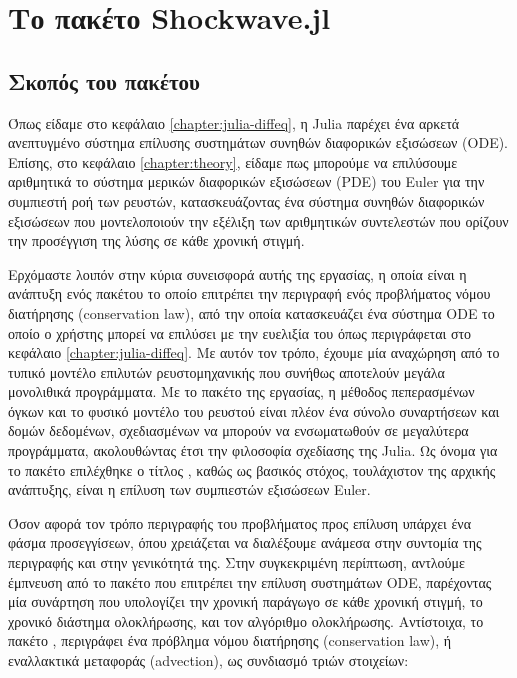 \chapter{Το πακέτο Shockwave.jl}

\section{Σκοπός του πακέτου}

Όπως είδαμε στο κεφάλαιο \ref{chapter:julia-diffeq}, η Julia παρέχει ένα αρκετά ανεπτυγμένο σύστημα επίλυσης συστημάτων συνηθών διαφορικών εξισώσεων (ODE).
Επίσης, στο κεφάλαιο \ref{chapter:theory}, είδαμε πως μπορούμε να επιλύσουμε αριθμητικά το σύστημα μερικών διαφορικών εξισώσεων (PDE) του Euler για την συμπιεστή ροή των ρευστών, κατασκευάζοντας ένα σύστημα συνηθών διαφορικών εξισώσεων που μοντελοποιούν την εξέλιξη των αριθμητικών συντελεστών που ορίζουν την προσέγγιση της λύσης σε κάθε χρονική στιγμή.

Ερχόμαστε λοιπόν στην κύρια συνεισφορά αυτής της εργασίας, η οποία είναι η ανάπτυξη ενός πακέτου το οποίο επιτρέπει την περιγραφή ενός προβλήματος νόμου διατήρησης (conservation law), από την οποία κατασκευάζει ένα σύστημα ODE το οποίο ο χρήστης μπορεί να επιλύσει με την ευελιξία του  όπως περιγράφεται στο κεφάλαιο \ref{chapter:julia-diffeq}.
Με αυτόν τον τρόπο, έχουμε μία αναχώρηση από το τυπικό μοντέλο επιλυτών ρευστομηχανικής που συνήθως αποτελούν μεγάλα μονολιθικά προγράμματα.
Με το πακέτο της εργασίας, η μέθοδος πεπερασμένων όγκων και το φυσικό μοντέλο του ρευστού είναι πλέον ένα σύνολο συναρτήσεων και δομών δεδομένων, σχεδιασμένων να μπορούν να ενσωματωθούν σε μεγαλύτερα προγράμματα, ακολουθώντας έτσι την φιλοσοφία σχεδίασης της Julia.
Ως όνομα για το πακέτο επιλέχθηκε ο τίτλος , καθώς ως βασικός στόχος, τουλάχιστον της αρχικής ανάπτυξης, είναι η επίλυση των συμπιεστών εξισώσεων Euler.

Όσον αφορά τον τρόπο περιγραφής του προβλήματος προς επίλυση υπάρχει ένα φάσμα προσεγγίσεων, όπου χρειάζεται να διαλέξουμε ανάμεσα στην συντομία της περιγραφής και στην γενικότητά της.
Στην συγκεκριμένη περίπτωση, αντλούμε έμπνευση από το πακέτο  που επιτρέπει την επίλυση συστημάτων ODE, παρέχοντας μία συνάρτηση που υπολογίζει την χρονική παράγωγο σε κάθε χρονική στιγμή, το χρονικό διάστημα ολοκλήρωσης, και τον αλγόριθμο ολοκλήρωσης.
Αντίστοιχα, το πακέτο , περιγράφει ένα πρόβλημα νόμου διατήρησης (conservation law), ή εναλλακτικά μεταφοράς (advection), ως συνδιασμό τριών στοιχείων:

